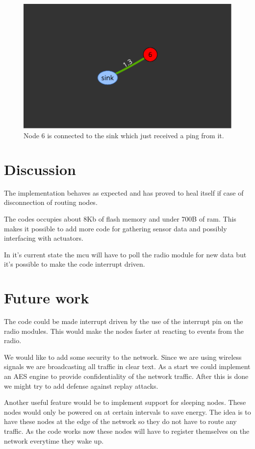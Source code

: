 \documentclass[a4paper,11pt]{article}
\begin{document}
\begin{figure}[H]
  \begin{center}
    \includegraphics[width=.5\textwidth]{map}
  \end{center}
  \caption{Node 6 is connected to the sink which just received a ping from it.}
  \label{fig:web}
\end{figure}

\section{Discussion}
The implementation behaves as expected and has proved to heal itself
if case of disconnection of routing nodes. 

The codes occupies about 8Kb of flash memory and under 700B of
ram. This makes it possible to add more code for gathering sensor data
and possibly interfacing with actuators. 

In it's current state the mcu will have to poll the radio module for
new data but it's possible to make the code interrupt driven.

\section{Future work}
The code could be made interrupt driven by the use of the interrupt 
pin on the radio modules. This would make the nodes faster at reacting
to events from the radio. 

We would like to add some security to the network. Since we are using
wireless signals we are broadcasting all traffic in clear text. As a 
start we could implement an AES engine to provide confidentiality of  
the network traffic. After this is done we might try to add defense against 
replay attacks. 

Another useful feature would be to implement support for sleeping 
nodes. These nodes would only be powered on at certain intervals to
save energy. The idea is to have these nodes at the edge of the 
network so they do not have to route any traffic. As the code works
now these nodes will have to register themselves on the network
everytime they wake up. 
\end{document}
